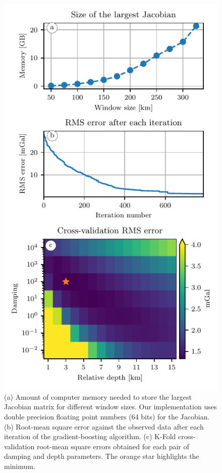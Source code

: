 \begin{figure}[tbh!]
        \includegraphics[width=0.6\linewidth]{figs/eql-gradient-boosted/australia-memory-cv-error.pdf}
    \fi
    \makeatother
    \caption{
        (a) Amount of computer memory needed to store the largest Jacobian
        matrix for different window sizes. Our implementation uses double
        precision floating point numbers (64 bits) for the Jacobian.
        (b) Root-mean square error against the observed data after each
        iteration of the gradient-boosting algorithm.
        (c) K-Fold cross-validation root-mean square errors obtained for each
        pair of damping and depth parameters. The orange star highlights the
        minimum.
    }
    \label{fig:australia-memory-cv-error}
\end{figure}

